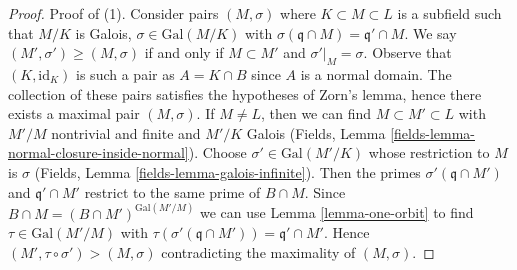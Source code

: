 \begin{proof}
Proof of (1). Consider pairs $(M, \sigma)$ where $K \subset M \subset L$
is a subfield such that $M/K$ is Galois, $\sigma \in \text{Gal}(M/K)$
with $\sigma(\mathfrak q \cap M) = \mathfrak q' \cap M$.
We say $(M', \sigma') \geq (M, \sigma)$ if and only if
$M \subset M'$ and $\sigma'|_M = \sigma$.
Observe that $(K, \text{id}_K)$ is such a pair as $A = K \cap B$
since $A$ is a normal domain.
The collection of these pairs satisfies the hypotheses of Zorn's lemma,
hence there exists a maximal pair $(M, \sigma)$.
If $M \not = L$, then we can find
$M \subset M' \subset L$ with $M'/M$ nontrivial and finite and $M'/K$ Galois
(Fields, Lemma \ref{fields-lemma-normal-closure-inside-normal}).
Choose $\sigma' \in \text{Gal}(M'/K)$ whose restriction to $M$
is $\sigma$ (Fields, Lemma \ref{fields-lemma-galois-infinite}).
Then the primes $\sigma'(\mathfrak q \cap M')$ and $\mathfrak q' \cap M'$
restrict to the same prime of $B \cap M$. Since
$B \cap M = (B \cap M')^{\text{Gal}(M'/M)}$ we can
use Lemma \ref{lemma-one-orbit} to find $\tau \in \text{Gal}(M'/M)$
with $\tau(\sigma'(\mathfrak q \cap M')) = \mathfrak q' \cap M'$.
Hence $(M', \tau \circ \sigma') > (M, \sigma)$
contradicting the maximality of $(M, \sigma)$.


\end{proof}

